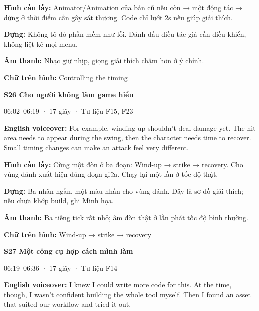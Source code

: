 \documentclass[10pt,a4paper]{article}
\begin{document}
\textbf{Hình cần lấy:}  Animator/Animation của bản cũ nếu còn → một động tác → dừng ở thời điểm cần gây sát thương. Code chỉ lướt 2s nếu giúp giải thích.\par

\textbf{Dựng:}  Không tô đỏ phần mềm như lỗi. Đánh dấu điều tác giả cần điều khiển, không liệt kê mọi menu.\par

\textbf{Âm thanh:}  Nhạc giữ nhịp, giọng giải thích chậm hơn ở ý chính.\par

\textbf{Chữ trên hình:}  Controlling the timing\par

\textbf{S26 Cho người không làm game hiểu}\par

06:02–06:19 · 17 giây · Tư liệu F15, F23\par

\textbf{English voiceover:}  For example, winding up shouldn’t deal damage yet. The hit area needs to appear during the swing, then the character needs time to recover. Small timing changes can make an attack feel very different.\par

\textbf{Hình cần lấy:}  Cùng một đòn ở ba đoạn: Wind-up → strike → recovery. Cho vùng đánh xuất hiện đúng đoạn giữa. Chạy lại một lần ở tốc độ thật.\par

\textbf{Dựng:}  Ba nhãn ngắn, một màu nhấn cho vùng đánh. Đây là sơ đồ giải thích; nếu chưa khớp build, ghi Minh họa.\par

\textbf{Âm thanh:}  Ba tiếng tick rất nhỏ; âm đòn thật ở lần phát tốc độ bình thường.\par

\textbf{Chữ trên hình:}  Wind-up → strike → recovery\par

\textbf{S27 Một công cụ hợp cách mình làm}\par

06:19–06:36 · 17 giây · Tư liệu F14\par

\textbf{English voiceover:}  I knew I could write more code for this. At the time, though, I wasn’t confident building the whole tool myself. Then I found an asset that suited our workflow and tried it out.\par
\end{document}
